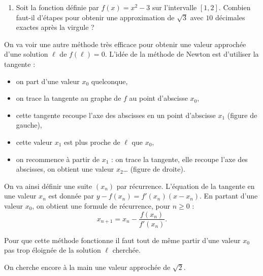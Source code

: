 \documentclass[11pt,class=report,crop=false]{standalone}
\begin{document}
\begin{activite}[Dichotomie]
\begin{enumerate}
  \item Soit la fonction définie par $f(x) = x^2-3$ sur l'intervalle $[1,2]$. Combien faut-il d'étapes pour obtenir une approximation de $\sqrt{3}$ avec $10$ décimales exactes après la virgule ?
  
\end{enumerate} 

\end{activite}



\begin{cours}

	
On va voir une autre méthode très efficace pour obtenir une valeur approchée d'une solution $\ell$
de $f(\ell)=0$.
L'idée de la méthode de Newton est d'utiliser la tangente :
\begin{itemize} 
  \item on part d'une valeur $x_0$ quelconque,
  \item on trace la tangente au graphe de $f$ au point d'abscisse $x_0$,
  \item cette tangente recoupe l'axe des abscisses en un point d'abscisse $x_1$ (figure de gauche),
  \item cette valeur $x_1$ est plus proche de $\ell$ que $x_0$,
  \item on recommence à partir de $x_1$ : on trace la tangente, elle recoupe l'axe des abscisses, on obtient une valeur $x_2$\ldots{} (figure de droite).
\end{itemize}
  
  
On va ainsi définir une suite $(x_n)$ par récurrence.  
L'équation de la tangente en une valeur $x_n$ est donnée par 
$y-f(x_n) = f'(x_n)(x-x_n)$. En partant d'une valeur $x_0$, on obtient une formule de récurrence, pour $n\ge0$  :
$$x_{n+1} = x_n - \frac{f(x_n)}{f'(x_n)}.$$


Pour que cette méthode fonctionne il faut tout de même partir d'une valeur $x_0$ pas trop éloignée de la solution $\ell$ cherchée.

\begin{exemple}
On cherche encore \og{}à la main\fg{} une valeur approchée de $\sqrt{2}$.


\end{exemple}
\end{cours}
\end{document}
